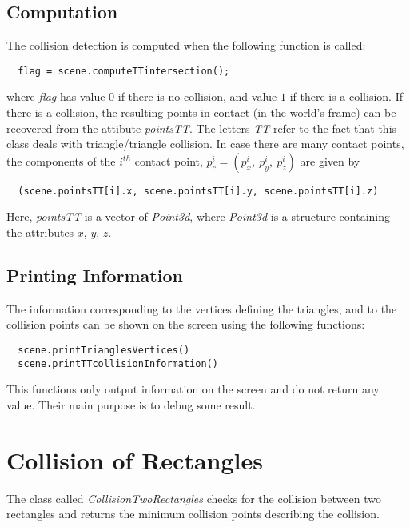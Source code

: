 \documentclass[11pt,a4paper]{article}
\begin{document}
\subsection*{Computation}
The collision detection is computed when the following function is called:
\begin{lstlisting}
  flag = scene.computeTTintersection();
\end{lstlisting}
where \textit{flag} has value $0$ if there is no collision, and value $1$ if there is a collision. If there is a collision, the resulting points in contact (in the world's frame) can be recovered from the attibute \textit{pointsTT}. The letters \textit{TT} refer to the fact that this class deals with triangle/triangle collision. In case there are many contact points, the components of the $i^{th}$ contact point, $p^i_c = (p^i_x, \ p^i_y, \ p^i_z)$ are given by
\begin{lstlisting}
  (scene.pointsTT[i].x, scene.pointsTT[i].y, scene.pointsTT[i].z)
\end{lstlisting}
Here, \textit{pointsTT} is a vector of \textit{Point3d}, where \textit{Point3d} is a structure containing the attributes $x$, $y$, $z$. 

\subsection*{Printing Information}
The information corresponding to the vertices defining the triangles, and to the collision points can be shown on the screen using the following functions:
\begin{lstlisting}
  scene.printTrianglesVertices()
  scene.printTTcollisionInformation()
\end{lstlisting}
This functions only output information on the screen and do not return any value. Their main purpose is to debug some result.


\section{Collision of Rectangles}

The class called \textit{CollisionTwoRectangles} checks for the collision between two rectangles and returns the minimum collision points describing the collision.
\end{document}
